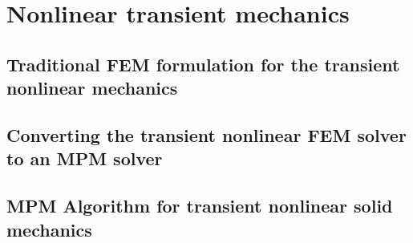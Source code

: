 \section{Nonlinear transient \twoD mechanics}
\subsection{Traditional FEM formulation for the transient nonlinear \twoD mechanics}
\subsection{Converting the \twoD transient nonlinear FEM solver to an MPM solver}
\subsection{MPM Algorithm for \twoD transient nonlinear solid mechanics}